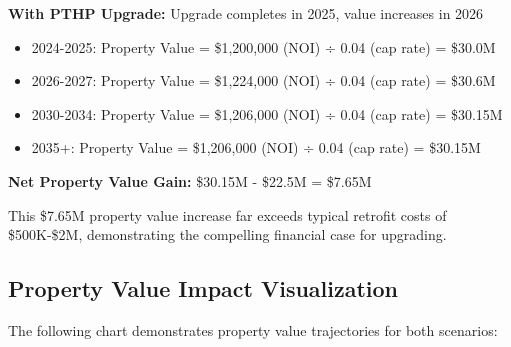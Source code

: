 \documentclass{article}
\begin{document}
\textbf{With PTHP Upgrade:} Upgrade completes in 2025, value increases in 2026
\begin{itemize}
    \item 2024-2025: Property Value = \$1,200,000 (NOI) ÷ 0.04 (cap rate) = \$30.0M
    \item 2026-2027: Property Value = \$1,224,000 (NOI) ÷ 0.04 (cap rate) = \$30.6M
    \item 2030-2034: Property Value = \$1,206,000 (NOI) ÷ 0.04 (cap rate) = \$30.15M  
    \item 2035+: Property Value = \$1,206,000 (NOI) ÷ 0.04 (cap rate) = \$30.15M
\end{itemize}

\textbf{Net Property Value Gain:} \$30.15M - \$22.5M = \$7.65M

This \$7.65M property value increase far exceeds typical retrofit costs of \$500K-\$2M, demonstrating the compelling financial case for upgrading.

\subsection{Property Value Impact Visualization}

The following chart demonstrates property value trajectories for both scenarios:
\end{document}
